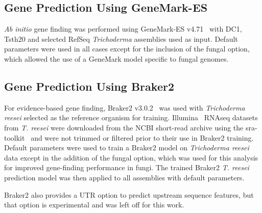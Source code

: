 \subsection{Gene Prediction Using GeneMark-ES}
\label{met:genemark}


\textit{Ab initio} gene finding was performed using GeneMark-ES
v4.71~\cite{borodovsky2011a} with DC1, Tsth20 and selected RefSeq
\textit{Trichoderma} assemblies used as input. Default parameters were
used in all cases except for the inclusion of the fungal option, which allowed the use
of a GeneMark model specific to fungal genomes.

%

\subsection{Gene Prediction Using Braker2}
\label{met:braker2}

For evidence-based gene finding, Braker2 v3.0.2~\cite{bruna2021a} was
used with \textit{Trichoderma reesei} selected as the reference
organism for
training. Illumina~\cite{bennett2004a}
RNAseq datasets from \textit{T. reesei} were downloaded from the NCBI
short-read archive using the sra-toolkit~\cite{zotero-item-326} and were not
trimmed or filtered prior to their use in Braker2 training. Default
parameters were used to train a Braker2 model on \textit{Trichoderma
  reesei} data except in the addition of the fungal option, which was used
for this analysis for improved gene-finding performance in fungi. The
trained Braker2 \textit{T. reesei} prediction model was then applied
to all assemblies with default parameters.

Braker2 also provides a UTR option to predict upstream sequence
features, but that option is experimental and was left off for this
work.


